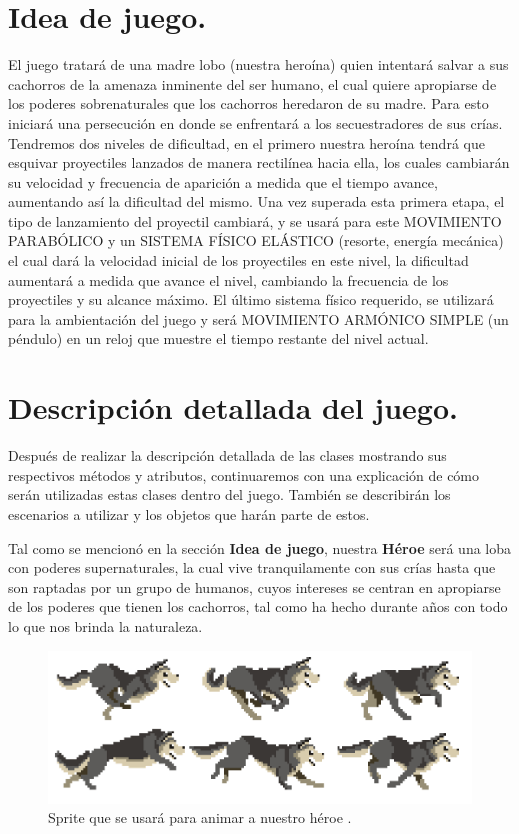 \documentclass{article}
\begin{document}
\section{Idea de juego.}\label{integrado}
El juego tratará de una madre lobo (nuestra heroína) quien intentará salvar a sus cachorros de la amenaza inminente del ser humano, el cual quiere apropiarse de los poderes sobrenaturales que los cachorros heredaron de su madre. Para esto iniciará una persecución en donde se enfrentará a los secuestradores de sus crías. Tendremos dos niveles de dificultad, en el primero nuestra heroína tendrá que esquivar proyectiles lanzados de manera rectilínea hacia ella, los cuales cambiarán su velocidad y frecuencia de aparición a medida que el tiempo avance, aumentando así la dificultad del mismo. Una vez superada esta primera etapa, el tipo de lanzamiento del proyectil cambiará, y se usará para este MOVIMIENTO PARABÓLICO y un SISTEMA FÍSICO ELÁSTICO (resorte, energía mecánica) el cual dará la velocidad inicial de los proyectiles en este nivel, la dificultad aumentará a medida que avance el nivel, cambiando la frecuencia de los proyectiles y su alcance máximo.
El último sistema físico requerido, se utilizará para la ambientación del juego y será MOVIMIENTO ARMÓNICO SIMPLE (un péndulo) en un reloj que muestre el tiempo restante del nivel actual.

\section{Descripción detallada del juego.}

Después de realizar la descripción detallada de las clases mostrando sus respectivos métodos y atributos, continuaremos con una explicación de cómo serán utilizadas estas clases dentro del juego. También se describirán los escenarios a utilizar y los objetos que harán parte de estos.

Tal como se mencionó en la sección \textbf{Idea de juego}, nuestra \textbf{Héroe} será una loba con poderes supernaturales, la cual vive tranquilamente con sus crías hasta que son raptadas por un grupo de humanos, cuyos intereses se centran en apropiarse de los poderes que tienen los cachorros, tal como ha hecho durante años con todo lo que nos brinda la naturaleza.

\begin{figure}[h]
\includegraphics[scale=0.7]{Images/spriteheroe.png}
\centering
\caption{Sprite que se usará para animar a nuestro héroe .}
\label{fig:spriteheroe}
\end{figure}
\end{document}
